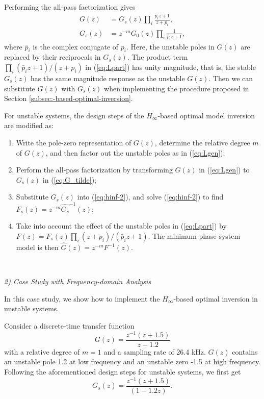 \documentclass [11pt, proquest] {uwthesis}[2020/02/24]
\begin{document}
Performing the all-pass factorization gives
\begin{align}
G(z) & =G_{s}(z)\prod_{i}\frac{\bar{p}_{i}z+1}{z+p_{i}},\label{eq:Lpart}\\
G_{s}(z) & =z^{-m}G_{0}(z)\prod_{i}\frac{1}{\bar{p}_{i}z+1},\label{eq:G_tilde}
\end{align}
where $\bar{p}_{i}$ is the complex conjugate of $p_{i}$. Here, the
unstable poles in $G(z)$ are replaced by their reciprocals in $G_{s}(z)$.
The product term $\prod_{i}(\bar{p}_{i}z+1)/(z+p_{i})$ in (\ref{eq:Lpart})
has unity magnitude, that is, the stable $G_{s}(z)$ has the same
magnitude response as the unstable $G(z)$. Then we can substitute
$G(z)$ with $G_{s}(z)$ when implementing the procedure proposed
in Section \ref{subsec:-based-optimal-inversion}.

For unstable systems, the design steps of the $H_{\infty}$-based
optimal model inversion are modified as:
\begin{enumerate}
\item Write the pole-zero representation of $G(z)$, determine the relative
degree $m$ of $G(z)$, and then factor out the unstable poles as
in (\ref{eq:Lgen});
\item Perform the all-pass factorization by transforming $G(z)$ in (\ref{eq:Lgen})
to $G_{s}(z)$ in (\ref{eq:G_tilde});
\item Substitute $G_{s}(z)$ into (\ref{eq:hinf-2}), and solve (\ref{eq:hinf-2})
to find $F_{s}(z)=z^{-m}\hat{G_{s}}^{-1}(z)$;
\item Take into account the effect of the unstable poles in (\ref{eq:Lpart})
by $F(z)=F_{s}(z)\prod_{i}(z+p_{i})/(\bar{p}_{i}z+1)$. The minimum-phase
system model is then $\hat{G}(z)=z^{-m}F^{-1}(z)$.
\end{enumerate}
\

\noindent \emph{2) Case Study with Frequency-domain Analysis}

In this case study, we show how to implement the $H_{\infty}$-based
optimal inversion in unstable systems.

Consider a discrete-time transfer function
\begin{equation}
G(z)=\frac{z^{-1}(z+1.5)}{z-1.2}\label{eq:Gz_unstable}
\end{equation}
with a relative degree of $m=1$ and a sampling rate of 26.4 kHz.
$G(z)$ contains an unstable pole 1.2 at low frequency and an unstable
zero -1.5 at high frequency. Following the aforementioned design steps
for unstable systems, we first get
\begin{equation}
G_{s}(z)=\frac{z^{-1}(z+1.5)}{(1-1.2z)}.\label{eq:Gz_tilde_unstable}
\end{equation}
\end{document}
